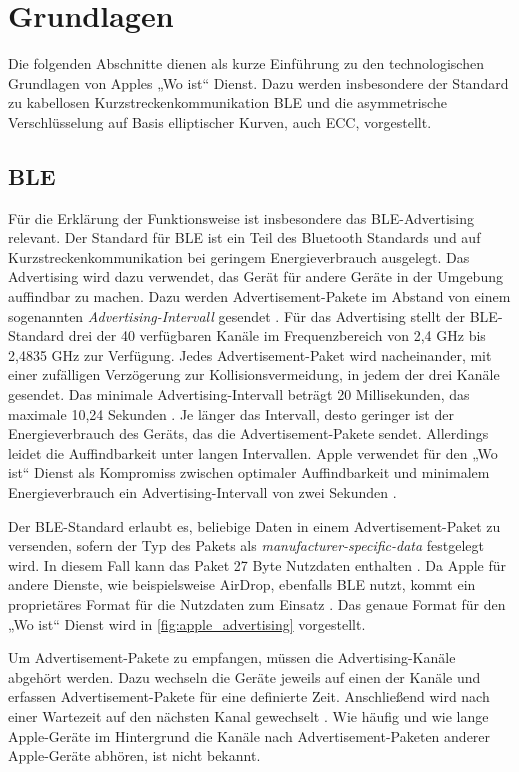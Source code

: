 \section{Grundlagen}
\label{sec:grundlagen}

Die folgenden Abschnitte dienen als kurze Einführung zu den technologischen Grundlagen von Apples „Wo ist“ Dienst.
Dazu werden insbesondere der Standard zu kabellosen Kurzstreckenkommunikation \ac{BLE} und die asymmetrische Verschlüsselung auf Basis elliptischer Kurven, auch \ac{ECC}, vorgestellt.

\subsection{\ac{BLE}}
\label{sec:ble}
Für die Erklärung der Funktionsweise ist insbesondere das \ac{BLE}-Advertising relevant.
Der Standard für \ac{BLE} ist ein Teil des Bluetooth Standards und auf Kurzstreckenkommunikation bei geringem Energieverbrauch ausgelegt.
Das Advertising wird dazu verwendet, das Gerät für andere Geräte in der Umgebung auffindbar zu machen.
Dazu werden Advertisement-Pakete im Abstand von einem sogenannten \textit{Advertising-Intervall} gesendet \cite{Spec_BLE_5.3}.
Für das Advertising stellt der \ac{BLE}-Standard drei der 40 verfügbaren Kanäle im Frequenzbereich von 2,4 GHz bis 2,4835 GHz zur Verfügung.
Jedes Advertisement-Paket wird nacheinander, mit einer zufälligen Verzögerung zur Kollisionsvermeidung, in jedem der drei Kanäle gesendet.
Das minimale Advertising-Intervall beträgt 20 Millisekunden, das maximale 10,24 Sekunden \cite{Spec_BLE_5.3}.
Je länger das Intervall, desto geringer ist der Energieverbrauch des Geräts, das die Advertisement-Pakete sendet.
Allerdings leidet die Auffindbarkeit unter langen Intervallen.
Apple verwendet für den „Wo ist“ Dienst als Kompromiss zwischen optimaler Auffindbarkeit und minimalem Energieverbrauch ein Advertising-Intervall von zwei Sekunden \cite{Apple_FindMySpec}.


Der \ac{BLE}-Standard erlaubt es, beliebige Daten in einem Advertisement-Paket zu versenden, sofern der Typ des Pakets als \textit{manufacturer-specific-data} festgelegt wird.
In diesem Fall kann das Paket 27 Byte Nutzdaten enthalten \cite{Spec_BLE_5.3}.
Da Apple für andere Dienste, wie beispielsweise AirDrop, ebenfalls \ac{BLE} nutzt, kommt ein proprietäres Format für die Nutzdaten zum Einsatz \cite{Heinrich_FindMy}.
Das genaue Format für den „Wo ist“ Dienst wird in \autoref{fig:apple_advertising} vorgestellt.

Um Advertisement-Pakete zu empfangen, müssen die Advertising-Kanäle abgehört werden.
Dazu wechseln die Geräte jeweils auf einen der Kanäle und erfassen Advertisement-Pakete für eine definierte Zeit.
Anschließend wird nach einer Wartezeit auf den nächsten Kanal gewechselt \cite{Spec_BLE_5.3}.
Wie häufig und wie lange Apple-Geräte im Hintergrund die Kanäle nach Advertisement-Paketen anderer Apple-Geräte abhören, ist nicht bekannt.

